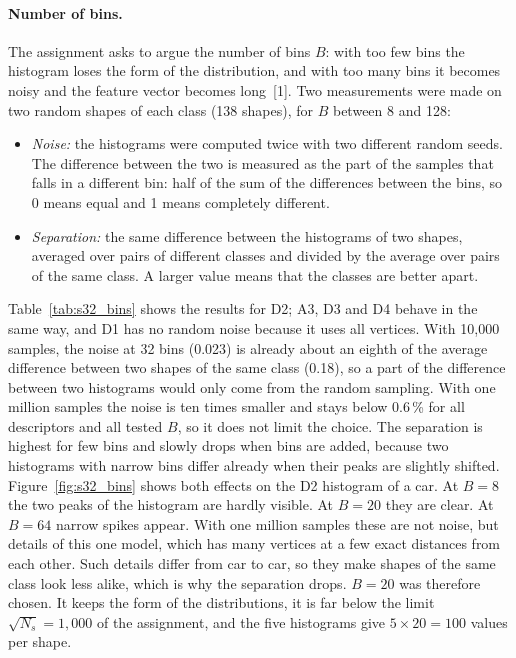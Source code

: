 \documentclass[10pt,a4paper]{article}
\begin{document}
\paragraph{Number of bins.}
The assignment asks to argue the number of bins $B$: with too few bins the histogram loses the form of the distribution, and with
too many bins it becomes noisy and the feature vector becomes long~[1]. Two measurements were made on two random shapes of each
class (138 shapes), for $B$ between 8 and 128:
\begin{itemize}
  \item \emph{Noise:} the histograms were computed twice with two different random seeds. The difference between the two is
  measured as the part of the samples that falls in a different bin: half of the sum of the differences between the bins,
  so 0 means equal and 1 means completely different.
  \item \emph{Separation:} the same difference between the histograms of two shapes, averaged over pairs of different classes and
  divided by the average over pairs of the same class. A larger value means that the classes are better apart.
\end{itemize}
Table~\ref{tab:s32_bins} shows the results for D2; A3, D3 and D4 behave in the same way, and D1 has no random noise because it uses all vertices. With 10,000 samples, the noise at
32 bins (0.023) is already about an eighth of the average difference between two shapes of the same class (0.18), so a part of
the difference between two histograms would only come from the random sampling. With one million samples the noise is ten times
smaller and stays below 0.6\,\% for all descriptors and all tested $B$, so it does not limit the choice. The separation is highest for few bins and slowly drops when bins are added, because two histograms with
narrow bins differ already when their peaks are slightly shifted. Figure~\ref{fig:s32_bins} shows both effects on the D2 histogram of a car. At $B=8$ the
two peaks of the histogram are hardly visible. At $B=20$ they are
clear. At $B=64$ narrow spikes appear. With one million samples these are not noise, but details of this one model, which has
many vertices at a few exact distances from each other. Such details differ from car to car, so they make shapes of the same class
look less alike, which is why the separation drops. $B=20$ was therefore chosen. It keeps the form of the distributions, it is far below the limit $\sqrt{N_s}=1{,}000$ of the
assignment, and the five histograms give $5\times20=100$ values per shape.
\end{document}
